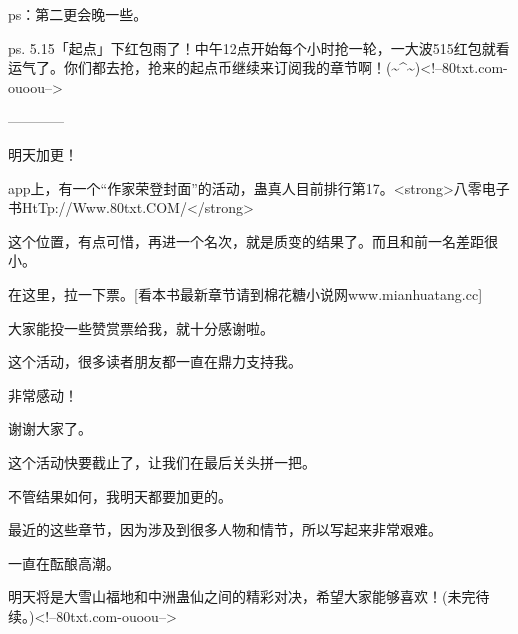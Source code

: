 \begin{this_body}
ps：第二更会晚一些。

ps. 5.15「起点」下红包雨了！中午12点开始每个小时抢一轮，一大波515红包就看运气了。你们都去抢，抢来的起点币继续来订阅我的章节啊！(\~{}\^{}\~{})<!--80txt.com-ouoou-->

------------

明天加更！

app上，有一个“作家荣登封面”的活动，蛊真人目前排行第17。<strong>八零电子书HtTp://Www.80txt.COM/</strong>

这个位置，有点可惜，再进一个名次，就是质变的结果了。而且和前一名差距很小。

在这里，拉一下票。[看本书最新章节请到棉花糖小说网www.mianhuatang.cc]

大家能投一些赞赏票给我，就十分感谢啦。

这个活动，很多读者朋友都一直在鼎力支持我。

非常感动！

谢谢大家了。

这个活动快要截止了，让我们在最后关头拼一把。

不管结果如何，我明天都要加更的。

最近的这些章节，因为涉及到很多人物和情节，所以写起来非常艰难。

一直在酝酿高潮。

明天将是大雪山福地和中洲蛊仙之间的精彩对决，希望大家能够喜欢！(未完待续。)<!--80txt.com-ouoou-->

\end{this_body}

